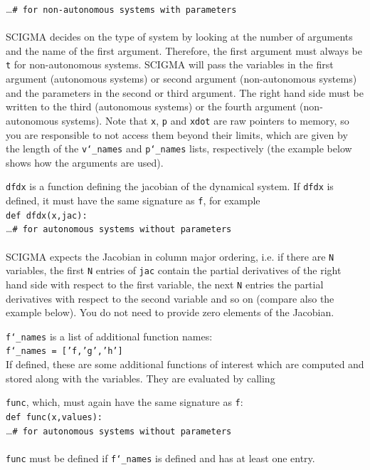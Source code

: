 \documentclass[10pt,a4paper,titlepage]{article}
\newcommand{\T}[1]{\texttt{#1}}
\begin{document}
\begin{description}
\hphantom{mmm}\ldots\hspace{8em}\T{\# for non-autonomous systems with parameters}\\\\
SCIGMA decides on the type of system by looking at the number of arguments and the name of the first argument. Therefore, the first argument must always be \T{t} for non-autonomous systems. SCIGMA will pass the variables in the first argument (autonomous systems) or second argument (non-autonomous systems) and the parameters in the second or third argument. The right hand side must be written to the third (autonomous systems) or the fourth argument (non-autonomous systems). Note that \T{x}, \T{p} and \T{xdot} are raw pointers to memory, so you are responsible to not access them beyond their limits, which are given by the length of the \T{v\char`_names} and \T{p\char`_names} lists, respectively (the example below shows how the arguments are used). 
\item{\T{dfdx}} is a function defining the jacobian of the dynamical system. If \T{dfdx} is defined, it must have the same signature as \T{f}, for example\\
\T{def dfdx(x,jac):}\\
\hphantom{mmm}\ldots\hspace{8em}\T{\# for autonomous systems without parameters}\\\\
SCIGMA expects the Jacobian in column major ordering, i.e. if there are \T{N} variables, the first \T{N} entries of \T{jac} contain the partial derivatives of the right hand side with respect  to the first variable, the next \T{N} entries the partial derivatives with respect to the second variable and so on (compare also the example below). You do not need to provide zero elements of the Jacobian.
\item{\T{f\char`_names}} is a list of additional function names:\\
\T{f\char`_names = ['f,'g','h']}\\ 
If defined, these are some additional functions of interest which are computed and stored along with the variables. They are evaluated by calling 
\item{\T{func}}, which, must again have the same signature as \T{f}:\\
\T{def func(x,values):}\\
\hphantom{mmm}\ldots\hspace{8em}\T{\# for autonomous systems without parameters}\\\\
\T{func} must be defined if \T{f\char`_names} is defined and has at least one entry.	 
\end{description}
\end{document}
